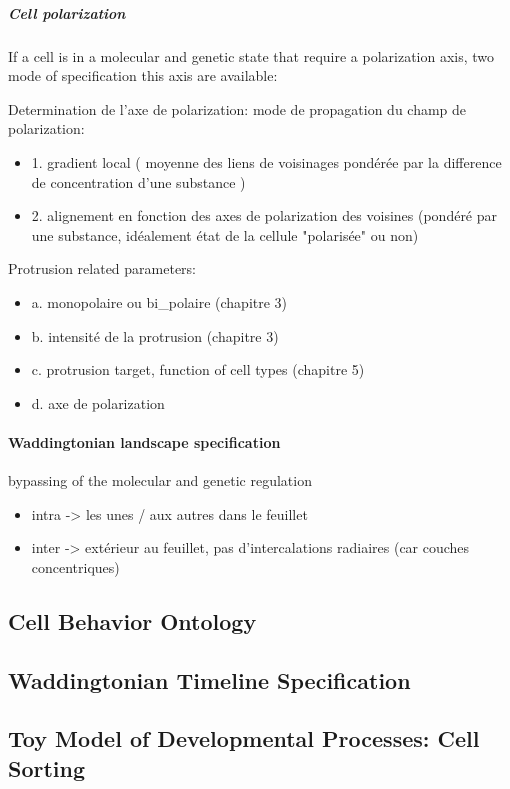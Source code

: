 \subparagraph{Cell polarization}

  If a cell is in a molecular and genetic state that require a polarization axis, two mode of specification this axis are available:  

  Determination de l'axe de polarization: mode de propagation du champ de polarization:  
\begin{itemize}
	\item 1. gradient local ( moyenne des liens de voisinages pondérée par la difference de concentration d'une substance )
	\item 2. alignement en fonction des axes de polarization des voisines (pondéré par une substance, idéalement état de la cellule "polarisée" ou non)
\end{itemize}

  Protrusion related parameters: 
\begin{itemize}
	\item a. monopolaire ou bi_polaire (chapitre 3)
	\item b. intensité de la protrusion (chapitre 3)
	\item c. protrusion target, function of cell types (chapitre 5)
	\item d. axe de polarization
\end{itemize}

\paragraph{Waddingtonian landscape specification}

  bypassing of the molecular and genetic regulation 
\begin{itemize}
	\item intra -> les unes / aux autres dans le feuillet
	\item inter -> extérieur au feuillet, pas d'intercalations radiaires (car couches concentriques) 
\end{itemize}

\subsection{Cell Behavior Ontology  }

\subsection{Waddingtonian Timeline Specification  }

\subsection{Toy Model of Developmental Processes: Cell Sorting  }

